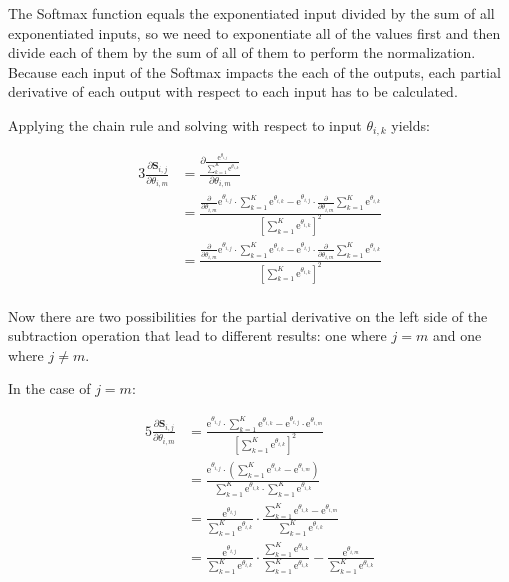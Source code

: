 \documentclass[a4paper]{report}
\newcommand{\euler}{\mathrm{e}}
\newcommand{\matr}[1]{\mathbf{#1}}
\begin{document}
The Softmax function equals the exponentiated input divided by the sum of all exponentiated inputs, so we need to exponentiate all of the values first and then divide each of them by the sum of all of them to perform the normalization. Because each input of the Softmax impacts the each of the outputs, each partial derivative of each output with respect to each input has to be calculated. 

Applying the chain rule and solving with respect to input $\theta_{i,k}$ yields:

\begin{alignat*}{3}
    \frac{\partial \matr{S}_{i,j}}{\partial \theta_{i,m}} &= \frac{\partial \frac{\euler^{\theta_{i,j}}}{\sum_{k=1}^{K} \euler^{\theta_{i,k}}}}{\partial \theta_{i,m}} \\
    &= \frac{\frac{\partial}{\partial \theta_{i,m}} \euler^{\theta_{i,j}} \cdot \sum_{k=1}^{K} \euler^{\theta_{i,k}} - \euler^{\theta_{i,j}} \cdot \frac{\partial}{\partial \theta_{i,m}} \sum_{k=1}^{K} \euler^{\theta_{i,k}}}{[\sum_{k=1}^{K} \euler^{\theta_{i,k}}]^2} \\
    &= \frac{\frac{\partial}{\partial \theta_{i,m}} \euler^{\theta_{i,j}} \cdot \sum_{k=1}^{K} \euler^{\theta_{i,k}} - \euler^{\theta_{i,j}} \cdot \frac{\partial}{\partial \theta_{i,m}} \sum_{k=1}^{K} \euler^{\theta_{i,k}}}{[\sum_{k=1}^{K} \euler^{\theta_{i,k}}]^2} \\
\end{alignat*}

Now there are two possibilities for the partial derivative on the left side of the subtraction operation that lead to different results: one where $j=m$ and one where $j\not=m$.

In the case of $j=m$:

\begin{alignat*}{5}
    \frac{\partial \matr{S}_{i,j}}{\partial \theta_{i,m}} &= 
    \frac{\euler^{\theta_{i,j}} \cdot \sum_{k=1}^{K} \euler^{\theta_{i,k}} - \euler^{\theta_{i,j}} \cdot \euler^{\theta_{i,m}}}{[\sum_{k=1}^{K} \euler^{\theta_{i,k}}]^2} \\
    &= \frac{\euler^{\theta_{i,j}} \cdot (\sum_{k=1}^{K} \euler^{\theta_{i,k}} - \euler^{\theta_{i,m}})}{\sum_{k=1}^{K} \euler^{\theta_{i,k}} \cdot \sum_{k=1}^{K} \euler^{\theta_{i,k}}} \\
    &= \frac{\euler^{\theta_{i,j}}}{\sum_{k=1}^{K} \euler^{\theta_{i,k}}} \cdot \frac{\sum_{k=1}^{K} \euler^{\theta_{i,k}} - \euler^{\theta_{i,m}}}{\sum_{k=1}^{K} \euler^{\theta_{i,k}}} \\
    &= \frac{\euler^{\theta_{i,j}}}{\sum_{k=1}^{K} \euler^{\theta_{i,k}}} \cdot \frac{\sum_{k=1}^{K} \euler^{\theta_{i,k}}}{\sum_{k=1}^{K} \euler^{\theta_{i,k}}} - \frac{\euler^{\theta_{i,m}}}{\sum_{k=1}^{K} \euler^{\theta_{i,k}}}
\end{alignat*}
\end{document}
